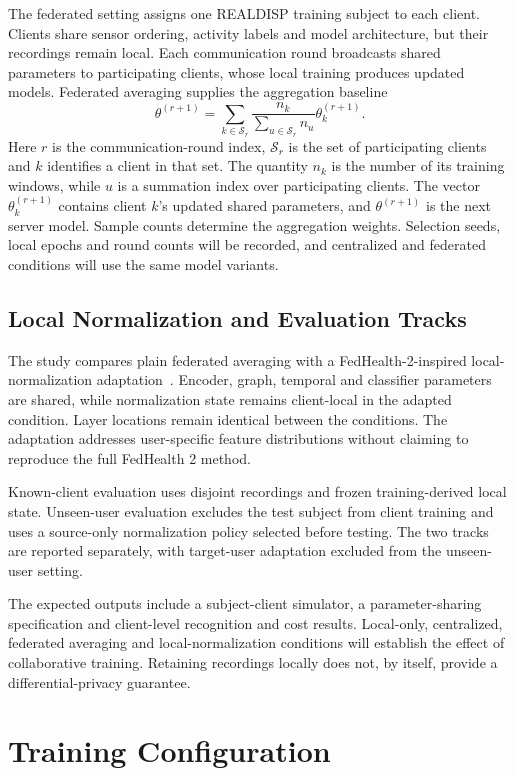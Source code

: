 \documentclass[10pt,a4paper,oneside,openany]{report}
\begin{document}
The federated setting assigns one REALDISP training subject to each client. Clients share sensor ordering, activity labels and model architecture, but their recordings remain local. Each communication round broadcasts shared parameters to participating clients, whose local training produces updated models. Federated averaging supplies the aggregation baseline~\cite{fedavg}
\[
\theta^{(r+1)}=\sum_{k\in\mathcal S_r}
\frac{n_k}{\sum_{u\in\mathcal S_r}n_u}\theta_k^{(r+1)}.
\]
Here $r$ is the communication-round index, $\mathcal S_r$ is the set of participating clients and $k$ identifies a client in that set. The quantity $n_k$ is the number of its training windows, while $u$ is a summation index over participating clients. The vector $\theta_k^{(r+1)}$ contains client $k$'s updated shared parameters, and $\theta^{(r+1)}$ is the next server model. Sample counts determine the aggregation weights. Selection seeds, local epochs and round counts will be recorded, and centralized and federated conditions will use the same model variants.

\subsection{Local Normalization and Evaluation Tracks}

The study compares plain federated averaging with a FedHealth-2-inspired local-normalization adaptation~\cite{fedhealth}. Encoder, graph, temporal and classifier parameters are shared, while normalization state remains client-local in the adapted condition. Layer locations remain identical between the conditions. The adaptation addresses user-specific feature distributions without claiming to reproduce the full FedHealth 2 method.

Known-client evaluation uses disjoint recordings and frozen training-derived local state. Unseen-user evaluation excludes the test subject from client training and uses a source-only normalization policy selected before testing. The two tracks are reported separately, with target-user adaptation excluded from the unseen-user setting.

The expected outputs include a subject-client simulator, a parameter-sharing specification and client-level recognition and cost results. Local-only, centralized, federated averaging and local-normalization conditions will establish the effect of collaborative training. Retaining recordings locally does not, by itself, provide a differential-privacy guarantee.

\section{Training Configuration}
\end{document}
